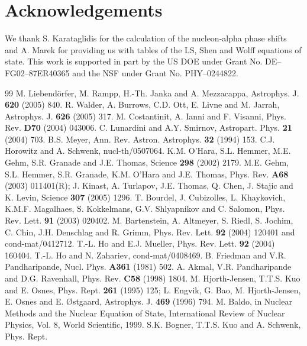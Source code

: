 \documentclass[aps,prc,twocolumn,showpacs,showkeys,amsmath,amssymb]{revtex4}
\begin{document}
\section*{Acknowledgements}

We thank S. Karataglidis for the calculation of the nucleon-alpha 
phase shifts and A. Marek for providing us with tables of the
LS, Shen and Wolff equations of state.
This work is supported in part by the US DOE under Grant No. 
DE--FG02--87ER40365 and the NSF under Grant No. PHY--0244822.

\begin{thebibliography}{99}
 M. Liebend\"orfer, M. Rampp, H.-Th. Janka and 
A. Mezzacappa, Astrophys. J. \textbf{620} (2005) 840.
 R. Walder, A. Burrows, C.D. Ott, E. Livne and 
M. Jarrah, Astrophys. J. \textbf{626} (2005) 317.
 M. Costantinit, A. Ianni and F. Visanni,
Phys. Rev. \textbf{D70} (2004) 043006.
 C. Lunardini and A.Y.
Smirnov, Astropart. Phys. \textbf{21} (2004) 703.
 B.S. Meyer, Ann. Rev. Astron. Astrophys. \textbf{32}
(1994) 153.
 C.J. Horowitz and A. Schwenk, nucl-th/0507064.
 K.M. O'Hara, S.L. Hemmer, M.E. Gehm, S.R. Granade
and J.E. Thomas, Science \textbf{298} (2002) 2179.
 M.E. Gehm, S.L. Hemmer, S.R. Granade, K.M. O'Hara
and J.E. Thomas, Phys. Rev. \textbf{A68} (2003) 011401(R); J. Kinast,
A. Turlapov, J.E. Thomas, Q. Chen, J. Stajic and K. Levin, Science
\textbf{307} (2005) 1296.
 T. Bourdel, J. Cubizolles, L. Khaykovich, K.M.F.
Magalhaes, S. Kokkelmans, G.V. Shlyapnikov and C. Salomon, Phys.
Rev. Lett. \textbf{91} (2003) 020402.
 M. Bartenstein, A. Altmeyer, S. Riedl, S. Jochim,
C. Chin, J.H. Denschlag and R. Grimm, Phys. Rev. Lett. \textbf{92} (2004) 
120401 and cond-mat/0412712.
 T.-L. Ho and E.J. Mueller, Phys. Rev. Lett. \textbf{92}
(2004) 160404.
 T.-L. Ho and N. Zahariev, cond-mat/0408469.
 B. Friedman and V.R. Pandharipande, Nucl. Phys.
\textbf{A361} (1981) 502.
 A. Akmal, V.R. Pandharipande and D.G. Ravenhall,
Phys. Rev. \textbf{C58} (1998) 1804.
 M. Hjorth-Jensen, T.T.S. Kuo and E. Osnes, 
Phys. Rept. \textbf{261} (1995) 125; L. Engvik, G. Bao, M. Hjorth-Jensen, 
E. Osnes and E. {\O}stgaard, Astrophys. J. \textbf{469} (1996) 794.
 M. Baldo, in Nuclear Methods and the Nuclear Equation 
of State, International Review of Nuclear Physics, Vol. 8, World 
Scientific, 1999.
 S.K. Bogner, T.T.S. Kuo and A. Schwenk, Phys. Rept.

\end{thebibliography}
\end{document}
